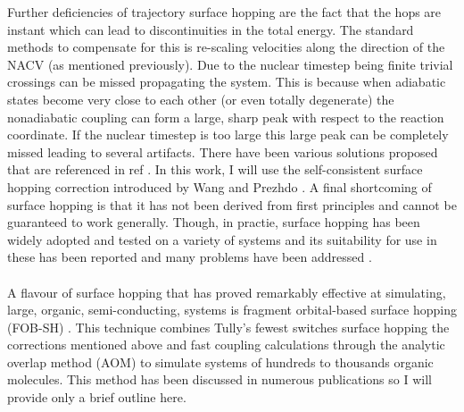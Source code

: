 Further deficiencies of trajectory surface hopping are the fact that the hops are instant which can lead to discontinuities in the total energy. The standard methods to compensate for this is re-scaling velocities along the direction of the NACV (as mentioned previously). Due to the nuclear timestep being finite trivial crossings can be missed  propagating the system. This is because when adiabatic states become very close to each other (or even totally degenerate) the nonadiabatic coupling can form a large, sharp peak with respect to the reaction coordinate. If the nuclear timestep is too large this large peak can be completely missed leading to several artifacts. There have been various solutions proposed that are referenced in ref \cite{Carof2017FSSH, Wang2016}. In this work, I will use the self-consistent surface hopping correction introduced by Wang and Prezhdo \cite{Wang2014}.  A final shortcoming of surface hopping is that it has not been derived from first principles and cannot be guaranteed to work generally. Though, in practie, surface hopping has been widely adopted and tested on a variety of systems and its suitability for use in these has been reported and many problems have been addressed \cite{Wang2016}.
\\\\
A flavour of surface hopping that has proved remarkably effective at simulating, large, organic, semi-conducting, systems is fragment orbital-based surface hopping (FOB-SH) \cite{FOB-SH_Spencer}. This technique combines Tully's fewest switches surface hopping\replace{;}{,} the corrections mentioned above\replace{;}{,} and fast coupling calculations through the analytic overlap method (AOM) \cite{gajdos_ultrafast_2014} to simulate systems of hundreds to thousands  organic molecules. This method has been discussed in numerous publications \cite{Giannini2018Crossover, Carof2017FSSH, Giannini2019, C9FD00046A, C9CP04770K, C9TC05270D, FlickPolarons, FOB-SH_Spencer, C6FD00107F} so I will provide only a brief outline here.
\\\\
